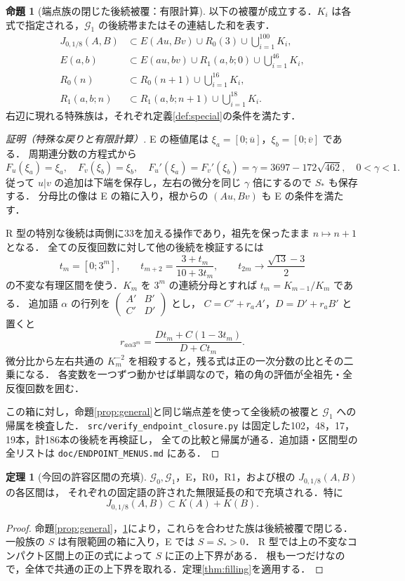 \documentclass[10pt,a4paper]{article}
\theoremstyle{definition}
\newtheorem{theorem}{定理}
\newtheorem{proposition}{命題}
\newcommand{\file}[1]{{\small\nolinkurl{#1}}}
\newcommand{\G}{\mathcal G}
\begin{document}
\begin{proposition}[端点族の閉じた後続被覆：有限計算]\label{prop:special}
以下の被覆が成立する．$K_i$ は各式で指定される，$\G_1$ の後続帯またはその連結した和を表す．
\begin{align*}
 J_{0,1/8}(A,B)&\subset E(Au,Bv)\cup R_0(3)\cup\bigcup_{i=1}^{100}K_i,\\
 E(a,b)&\subset E(au,bv)\cup R_1(a,b;0)\cup\bigcup_{i=1}^{46}K_i,\\
 R_0(n)&\subset R_0(n+1)\cup\bigcup_{i=1}^{16}K_i,\\
 R_1(a,b;n)&\subset R_1(a,b;n+1)\cup\bigcup_{i=1}^{18}K_i.
\end{align*}
右辺に現れる特殊族は，それぞれ定義\ref{def:special}の条件を満たす．
\end{proposition}
\begin{proof}[証明（特殊な戻りと有限計算）]
E の極値尾は $\xi_a=[0;\overline u]$，$\xi_b=[0;\overline v]$ である．
周期連分数の方程式から
\[
 F_u(\xi_a)=\xi_a,\quad F_v(\xi_b)=\xi_b,\quad
 F_u'(\xi_a)=F_v'(\xi_b)=\gamma=3697-172\sqrt{462},\quad 0<\gamma<1.
\]
従って $u|v$ の追加は下端を保存し，左右の微分を同じ $\gamma$ 倍にするので $S_*$ も保存する．
分母比の像は E の箱に入り，根からの $(Au,Bv)$ も E の条件を満たす．

R 型の特別な後続は両側に33を加える操作であり，祖先を保ったまま $n\mapsto n+1$ となる．
全ての反復回数に対して他の後続を検証するには
\[
 t_m=[0;3^m],\qquad t_{m+2}=\frac{3+t_m}{10+3t_m},\qquad
 t_{2m}\longrightarrow\frac{\sqrt{13}-3}{2}
\]
の不変な有理区間を使う．$K_m$ を $3^m$ の連続分母とすれば $t_m=K_{m-1}/K_m$ である．
追加語 $\alpha$ の行列を $\left(\begin{smallmatrix}A'&B'\\C'&D'\end{smallmatrix}\right)$ とし，
$C=C'+r_aA'$，$D=D'+r_aB'$ と置くと
\[
 r_{a\alpha3^m}=\frac{Dt_m+C(1-3t_m)}{D+Ct_m}.
\]
微分比から左右共通の $K_m^{-2}$ を相殺すると，残る式は正の一次分数の比とその二乗になる．
各変数を一つずつ動かせば単調なので，箱の角の評価が全祖先・全反復回数を囲む．

この箱に対し，命題\ref{prop:general}と同じ端点差を使って全後続の被覆と $\G_1$ への帰属を検査した．
\file{src/verify_endpoint_closure.py} は固定した102，48，17，19本，計186本の後続を再検証し，
全ての比較と帰属が通る．追加語・区間型の全リストは \file{doc/ENDPOINT_MENUS.md} にある．
\end{proof}

\begin{theorem}[今回の許容区間の充填]\label{thm:actual-filling}
$\G_0,\G_1$，E，R0，R1，および根の $J_{0,1/8}(A,B)$ の各区間は，
それぞれの固定語の許された無限延長の和で充填される．特に
\[
 J_{0,1/8}(A,B)\subset K(A)+K(B).
\]
\end{theorem}
\begin{proof}
命題\ref{prop:general}，\ref{prop:special}により，これらを合わせた族は後続被覆で閉じる．
一般族の $S$ は有限範囲の箱に入り，E では $S=S_*>0$．
R 型では上の不変なコンパクト区間上の正の式によって $S$ に正の上下界がある．
根も一つだけなので，全体で共通の正の上下界を取れる．定理\ref{thm:filling}を適用する．
\end{proof}
\end{document}
